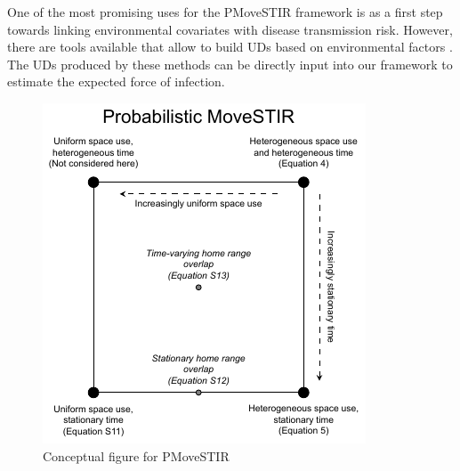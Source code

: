 \documentclass[letterpaper]{article}
\begin{document}
One of the most promising uses for the PMoveSTIR framework is as a first step towards linking environmental covariates with disease transmission risk. 
However, there are tools available that allow to build UDs based on environmental factors \citep{Signer2017,Michelot2020}. The UDs produced by these methods can be directly input into our framework to estimate the expected force of infection.





\begin{figure}
    \includegraphics[width=\textwidth]{figures/conceptual_figure_pmovestir.pdf}
    \caption{Conceptual figure for PMoveSTIR}
\end{figure}

\begin{figure}
\end{figure}
\end{document}
